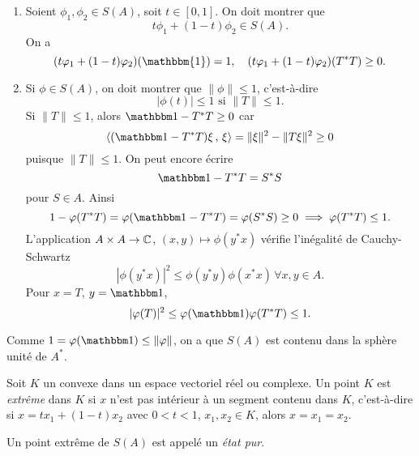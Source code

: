 \begin{preuve}
  \begin{enumerate}
  \item Soient $\phi_1, \phi_2 \in S(A)$, soit $t \in [0,1]$. On doit montrer que 
    \[ t \phi_1 + (1-t)\phi_2 \in S(A). \]
    On a 
    \[ (t \phi_1 + (1-t)\phi_2)(\mathbbm{1}) = 1,\quad (t \phi_1 + (1-t)\phi_2)(T^\ast T) \geq 0. \]
    
  \item Si $\phi \in S(A)$, on doit montrer que $\|\phi\| \leq 1$, c'est-à-dire 
    \[ |\phi(t)| \leq 1 \text{ si } \|T\| \leq 1. \]
    Si $\|T\| \leq 1$, alors $\un - T^\ast T \geq 0$ car 
    \[ \left \langle (\un - T^\ast T)\xi\, ,\, \xi \right \rangle  = \|\xi\|^2 - \|T \xi\|^2 \geq 0 \]
    puisque $\|T\| \leq 1$. On peut encore écrire 
    \[ \un - T^\ast T = S^\ast S \]
    pour $S \in A$. Ainsi 
    \[ 1 - \phi(T^\ast T) = \phi(\un - T^\ast T) = \phi(S^\ast S) \geq 0 \implies \phi(T^\ast T) \leq 1. \]
    L'application $A \times A \to \mathbb{C}$, $(x, y) \mapsto \phi(y^\ast x)$ vérifie l'inégalité de Cauchy-Schwartz 
    \[ |\phi(y^\ast x)|^2 \leq \phi(y^\ast y) \phi(x^\ast x)\, \forall x, y \in A. \]
    Pour $x = T$, $y = \un$, 
    \[ |\phi(T)|^2 \leq \phi(\un) \phi(T^\ast T) \leq 1. \]
  \end{enumerate}
\end{preuve}

\begin{rem}
  Comme $1 = \phi(\un) \leq \|\phi\|$, on a que $S(A)$ est contenu dans la sphère unité de $A^\ast$.
\end{rem}

\begin{defi}
  Soit $K$ un convexe dans un espace vectoriel réel ou complexe. Un point $K$ est \emph{extrême} dans $K$ si $x$ n'est pas intérieur à un segment contenu dans $K$, c'est-à-dire si $x =
  tx_1 + (1-t)x_2$ avec $0 < t < 1$, $x_1, x_2 \in K$, alors $x = x_1 = x_2$.

  \begin{center}
  \end{center}

  Un point extrême de $S(A)$ est
  appelé un \emph{état pur}.
\end{defi}

